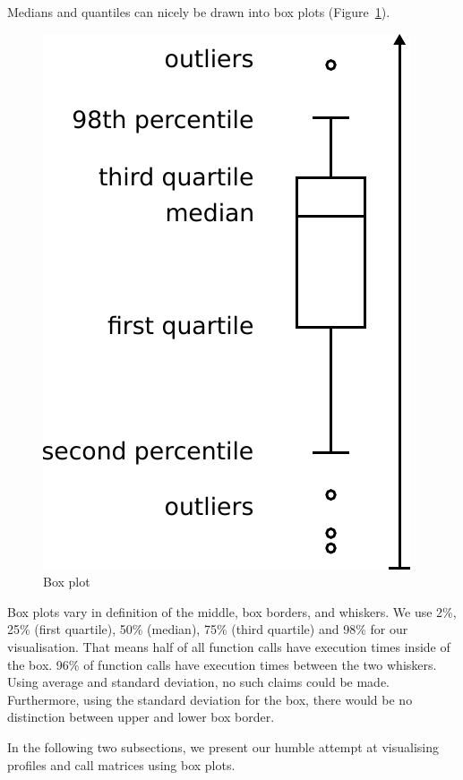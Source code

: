 \documentclass[b5paper, final, hauptseminar]{zih-template}
\begin{document}
Medians and quantiles can nicely be drawn into box plots (Figure~\ref{fig:id-boxplot}).
\begin{figure}[htbp]
	\centering
	\includegraphics[width=0.35\linewidth]{id-boxplot}
	\caption{Box plot}
	\label{fig:id-boxplot}
\end{figure}
Box plots vary in definition of the middle, box borders, and whiskers.
We use 2\%, 25\% (first quartile), 50\% (median), 75\% (third quartile) and 98\% for our visualisation.
That means half of all function calls have execution times inside of the box. 96\% of function calls have execution times between the two whiskers. Using average and standard deviation, no such claims could be made.
Furthermore, using the standard deviation for the box, there would be no distinction between upper and lower box border.

In the following two subsections, we present our humble attempt at visualising profiles and call matrices using box plots.

\clearpage
\end{document}
